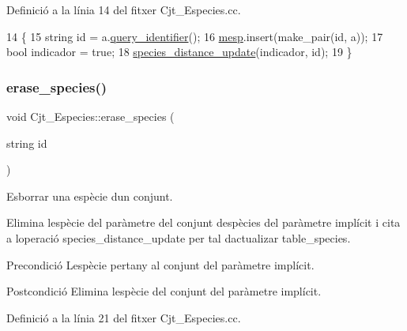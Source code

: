 Definició a la línia 14 del fitxer Cjt\+\_\+\+Especies.\+cc.


\begin{DoxyCode}
14                                                \{
15     \textcolor{keywordtype}{string} \textcolor{keywordtype}{id} = a.\hyperlink{class_especie_acfce0335ac5432dc681c2931b7986ace}{query\_identifier}();
16     \hyperlink{class_cjt___especies_a64a525b38c78935e7432b362ea9a2306}{mesp}.insert(make\_pair(\textcolor{keywordtype}{id}, a));
17     \textcolor{keywordtype}{bool} indicador = \textcolor{keyword}{true};
18     \hyperlink{class_cjt___especies_a043f6ce127ac78eb891f6d004eee40b0}{species\_distance\_update}(indicador, \textcolor{keywordtype}{id});    
19 \}
\end{DoxyCode}
\mbox{\label{class_cjt___especies_ad72a47e0a785ac34f4908b54dd413d32}} 
\subsubsection{\texorpdfstring{erase\+\_\+species()}{erase\_species()}}
{\footnotesize\ttfamily void Cjt\+\_\+\+Especies\+::erase\+\_\+species (\begin{DoxyParamCaption}\item[{string}]{id }\end{DoxyParamCaption})}



Esborrar una espècie d\textquotesingle{}un conjunt. 

Elimina l\textquotesingle{}espècie del paràmetre del conjunt d\textquotesingle{}espècies del paràmetre implícit i cita a l\textquotesingle{}operació species\+\_\+distance\+\_\+update per tal d\textquotesingle{}actualizar table\+\_\+species.

\begin{DoxyPrecond}{Precondició}
L\textquotesingle{}espècie pertany al conjunt del paràmetre implícit. 
\end{DoxyPrecond}
\begin{DoxyPostcond}{Postcondició}
Elimina l\textquotesingle{}espècie del conjunt del paràmetre implícit. 
\end{DoxyPostcond}


Definició a la línia 21 del fitxer Cjt\+\_\+\+Especies.\+cc.


